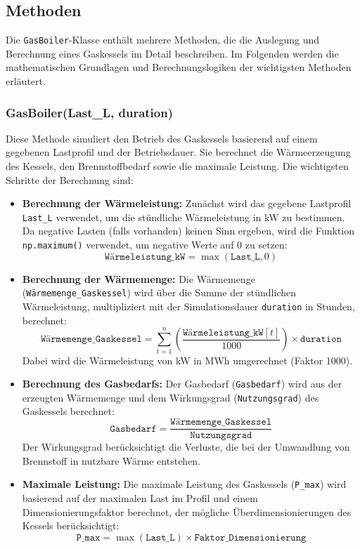\subsection{Methoden}
Die \texttt{GasBoiler}-Klasse enthält mehrere Methoden, die die Auslegung und Berechnung eines Gaskessels im Detail beschreiben. Im Folgenden werden die mathematischen Grundlagen und Berechnungslogiken der wichtigsten Methoden erläutert.

\subsubsection{GasBoiler(Last\_L, duration)}
Diese Methode simuliert den Betrieb des Gaskessels basierend auf einem gegebenen Lastprofil und der Betriebsdauer. Sie berechnet die Wärmeerzeugung des Kessels, den Brennstoffbedarf sowie die maximale Leistung. Die wichtigsten Schritte der Berechnung sind:

\begin{itemize}
    \item \textbf{Berechnung der Wärmeleistung:} Zunächst wird das gegebene Lastprofil \texttt{Last\_L} verwendet, um die stündliche Wärmeleistung in kW zu bestimmen. Da negative Lasten (falls vorhanden) keinen Sinn ergeben, wird die Funktion \texttt{np.maximum()} verwendet, um negative Werte auf 0 zu setzen:
    \[
    \texttt{Wärmeleistung\_kW} = \max(\texttt{Last\_L}, 0)
    \]
    
    \item \textbf{Berechnung der Wärmemenge:} Die Wärmemenge (\texttt{Wärmemenge\_Gaskessel}) wird über die Summe der stündlichen Wärmeleistung, multipliziert mit der Simulationsdauer \texttt{duration} in Stunden, berechnet:
    \[
    \texttt{Wärmemenge\_Gaskessel} = \sum_{t=1}^{n} \left( \frac{\texttt{Wärmeleistung\_kW}[t]}{1000} \right) \times \texttt{duration}
    \]
    Dabei wird die Wärmeleistung von kW in MWh umgerechnet (Faktor 1000).

    \item \textbf{Berechnung des Gasbedarfs:} Der Gasbedarf (\texttt{Gasbedarf}) wird aus der erzeugten Wärmemenge und dem Wirkungsgrad (\texttt{Nutzungsgrad}) des Gaskessels berechnet:
    \[
    \texttt{Gasbedarf} = \frac{\texttt{Wärmemenge\_Gaskessel}}{\texttt{Nutzungsgrad}}
    \]
    Der Wirkungsgrad berücksichtigt die Verluste, die bei der Umwandlung von Brennstoff in nutzbare Wärme entstehen.

    \item \textbf{Maximale Leistung:} Die maximale Leistung des Gaskessels (\texttt{P\_max}) wird basierend auf der maximalen Last im Profil und einem Dimensionierungsfaktor berechnet, der mögliche Überdimensionierungen des Kessels berücksichtigt:
    \[
    \texttt{P\_max} = \max(\texttt{Last\_L}) \times \texttt{Faktor\_Dimensionierung}
    \]
\end{itemize}

